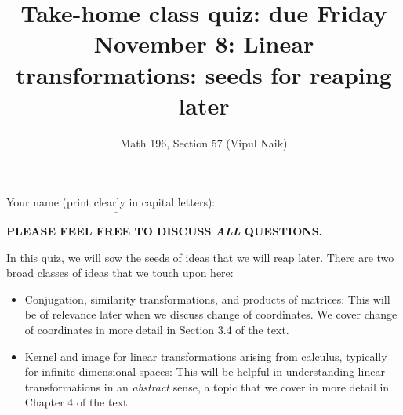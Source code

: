 \documentclass[10pt]{amsart}
\title{Take-home class quiz: due Friday November 8: Linear transformations: seeds for reaping later}
\author{Math 196, Section 57 (Vipul Naik)}
\begin{document}
\maketitle

Your name (print clearly in capital letters): $\underline{\qquad\qquad\qquad\qquad\qquad\qquad\qquad\qquad\qquad\qquad}$

{\bf PLEASE FEEL FREE TO DISCUSS {\em ALL} QUESTIONS.}

In this quiz, we will sow the seeds of ideas that we will reap
later. There are two broad classes of ideas that we touch upon here:

\begin{itemize}
\item Conjugation, similarity transformations, and products of
  matrices: This will be of relevance later when we discuss change of
  coordinates. We cover change of coordinates in more detail in
  Section 3.4 of the text.
\item Kernel and image for linear transformations arising from
  calculus, typically for infinite-dimensional spaces: This will be
  helpful in understanding linear transformations in an {\em abstract}
  sense, a topic that we cover in more detail in Chapter 4 of the text.
\end{itemize}
\end{document}
